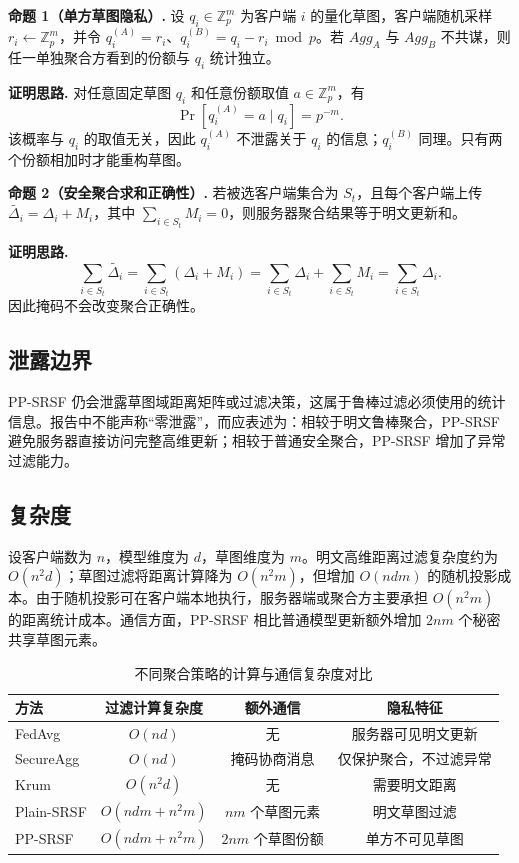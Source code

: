 \documentclass[UTF8,a4paper,zihao=-4]{ctexart}
\begin{document}
\textbf{命题 1（单方草图隐私）.} 设 $q_i\in\mathbb{Z}_p^m$ 为客户端 $i$ 的量化草图，客户端随机采样 $r_i\leftarrow\mathbb{Z}_p^m$，并令 $q_i^{(A)}=r_i$、$q_i^{(B)}=q_i-r_i\bmod p$。若 $Agg_A$ 与 $Agg_B$ 不共谋，则任一单独聚合方看到的份额与 $q_i$ 统计独立。

\textbf{证明思路.} 对任意固定草图 $q_i$ 和任意份额取值 $a\in\mathbb{Z}_p^m$，有
\[
\Pr[q_i^{(A)}=a\mid q_i]=p^{-m}.
\]
该概率与 $q_i$ 的取值无关，因此 $q_i^{(A)}$ 不泄露关于 $q_i$ 的信息；$q_i^{(B)}$ 同理。只有两个份额相加时才能重构草图。

\textbf{命题 2（安全聚合求和正确性）.} 若被选客户端集合为 $S_t$，且每个客户端上传 $\widetilde{\Delta_i}=\Delta_i+M_i$，其中 $\sum_{i\in S_t}M_i=0$，则服务器聚合结果等于明文更新和。

\textbf{证明思路.}
\[
\sum_{i\in S_t}\widetilde{\Delta_i}
=\sum_{i\in S_t}(\Delta_i+M_i)
=\sum_{i\in S_t}\Delta_i+\sum_{i\in S_t}M_i
=\sum_{i\in S_t}\Delta_i.
\]
因此掩码不会改变聚合正确性。

\subsection{泄露边界}
PP-SRSF 仍会泄露草图域距离矩阵或过滤决策，这属于鲁棒过滤必须使用的统计信息。报告中不能声称“零泄露”，而应表述为：相较于明文鲁棒聚合，PP-SRSF 避免服务器直接访问完整高维更新；相较于普通安全聚合，PP-SRSF 增加了异常过滤能力。

\subsection{复杂度}
设客户端数为 $n$，模型维度为 $d$，草图维度为 $m$。明文高维距离过滤复杂度约为 $O(n^2d)$；草图过滤将距离计算降为 $O(n^2m)$，但增加 $O(ndm)$ 的随机投影成本。由于随机投影可在客户端本地执行，服务器端或聚合方主要承担 $O(n^2m)$ 的距离统计成本。通信方面，PP-SRSF 相比普通模型更新额外增加 $2nm$ 个秘密共享草图元素。

\begin{table}[h]
\centering
\caption{不同聚合策略的计算与通信复杂度对比}
\label{tab:complexity}
\begin{tabular}{lccc}
\toprule
方法 & 过滤计算复杂度 & 额外通信 & 隐私特征\\
\midrule
FedAvg & $O(nd)$ & 无 & 服务器可见明文更新\\
SecureAgg & $O(nd)$ & 掩码协商消息 & 仅保护聚合，不过滤异常\\
Krum & $O(n^2d)$ & 无 & 需要明文距离\\
Plain-SRSF & $O(ndm+n^2m)$ & $nm$ 个草图元素 & 明文草图过滤\\
PP-SRSF & $O(ndm+n^2m)$ & $2nm$ 个草图份额 & 单方不可见草图\\
\bottomrule
\end{tabular}
\end{table}
\end{document}
